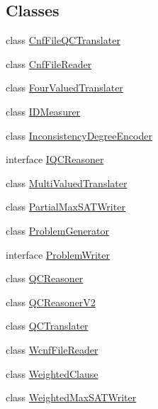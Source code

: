 \subsection*{Classes}
\begin{DoxyCompactItemize}
\item 
class \hyperlink{classedu_1_1pku_1_1id_1_1_cnf_file_q_c_translater}{CnfFileQCTranslater}
\item 
class \hyperlink{classedu_1_1pku_1_1id_1_1_cnf_file_reader}{CnfFileReader}
\item 
class \hyperlink{classedu_1_1pku_1_1id_1_1_four_valued_translater}{FourValuedTranslater}
\item 
class \hyperlink{classedu_1_1pku_1_1id_1_1_i_d_measurer}{IDMeasurer}
\item 
class \hyperlink{classedu_1_1pku_1_1id_1_1_inconsistency_degree_encoder}{InconsistencyDegreeEncoder}
\item 
interface \hyperlink{interfaceedu_1_1pku_1_1id_1_1_i_q_c_reasoner}{IQCReasoner}
\item 
class \hyperlink{classedu_1_1pku_1_1id_1_1_multi_valued_translater}{MultiValuedTranslater}
\item 
class \hyperlink{classedu_1_1pku_1_1id_1_1_partial_max_s_a_t_writer}{PartialMaxSATWriter}
\item 
class \hyperlink{classedu_1_1pku_1_1id_1_1_problem_generator}{ProblemGenerator}
\item 
interface \hyperlink{interfaceedu_1_1pku_1_1id_1_1_problem_writer}{ProblemWriter}
\item 
class \hyperlink{classedu_1_1pku_1_1id_1_1_q_c_reasoner}{QCReasoner}
\item 
class \hyperlink{classedu_1_1pku_1_1id_1_1_q_c_reasoner_v2}{QCReasonerV2}
\item 
class \hyperlink{classedu_1_1pku_1_1id_1_1_q_c_translater}{QCTranslater}
\item 
class \hyperlink{classedu_1_1pku_1_1id_1_1_wcnf_file_reader}{WcnfFileReader}
\item 
class \hyperlink{classedu_1_1pku_1_1id_1_1_weighted_clause}{WeightedClause}
\item 
class \hyperlink{classedu_1_1pku_1_1id_1_1_weighted_max_s_a_t_writer}{WeightedMaxSATWriter}
\end{DoxyCompactItemize}
